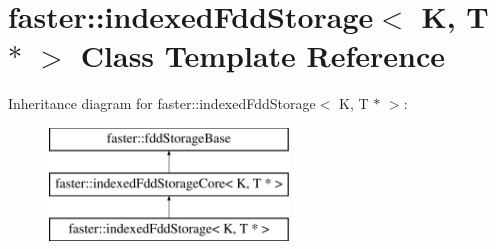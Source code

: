 \hypertarget{classfaster_1_1indexedFddStorage_3_01K_00_01T_01_5_01_4}{}\section{faster\+:\+:indexed\+Fdd\+Storage$<$ K, T $\ast$ $>$ Class Template Reference}
\label{classfaster_1_1indexedFddStorage_3_01K_00_01T_01_5_01_4}
Inheritance diagram for faster\+:\+:indexed\+Fdd\+Storage$<$ K, T $\ast$ $>$\+:\begin{figure}[H]
\begin{center}
\leavevmode
\includegraphics[height=3.000000cm]{classfaster_1_1indexedFddStorage_3_01K_00_01T_01_5_01_4}
\end{center}
\end{figure}
